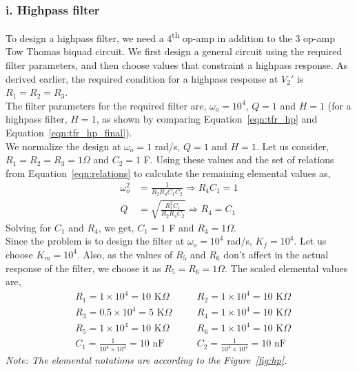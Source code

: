 \documentclass{lab_sheet}
\begin{document}
\subsubsection*{i. Highpass filter}
To design a highpass filter, we need a 4\textsuperscript{th} op-amp in addition to the 3 op-amp Tow Thomas biquad circuit. We first design a general circuit using the required filter parameters, and then choose values that constraint a highpass response. As derived earlier, the required condition for a highpass response at $V_2'$ is $R_1=R_2=R_3$.\\
The filter parameters for the required filter are, $\omega_o=10^4$, $Q=1$ and $H=1$ (for a highpass filter, $H=1$, as shown by comparing Equation~\ref{eqn:tfr_hp} and Equation~\ref{eqn:tfr_hp_final}).\\
We normalize the design at $\omega_o=1$ rad/s, $Q=1$ and $H=1$. Let us consider, $R_1=R_2=R_3=1\Omega$ and $C_2=1$ F. Using these values and the set of relations from Equation~\ref{eqn:relations} to calculate the remaining elemental values as,
 \begin{equation*}
    \begin{aligned}
       \omega_o^2&=\frac{1}{R_2R_4C_1C_2}\Rightarrow R_4C_1=1\\
       Q&=\sqrt{\frac{R_1^2C_1}{R_2R_4C_2}}\Rightarrow R_4=C_1
    \end{aligned}
\end{equation*}
Solving for $C_1$ and $R_4$, we get, $C_1=1$ F and  $R_4=1\Omega$.\\
Since the problem is to design the filter at $\omega_o=10^4$ rad/s, $K_f=10^4$. Let us choose $K_m=10^4$. Also, as the values of $R_5$ and $R_6$ don't affect in the actual response of the filter, we choose it as $R_5=R_6=1\Omega$. The scaled elemental values are,
 \begin{equation*}
    \begin{aligned}
       &R_1=1\times10^4=10 \text{ K}\Omega \quad &&R_2=1\times10^4=10 \text{ K}\Omega\\
       &R_3=0.5\times10^4=5 \text{ K}\Omega \quad &&R_4=1\times10^4=10 \text{ K}\Omega\\
       &R_5=1\times10^4=10 \text{ K}\Omega \quad &&R_6=1\times10^4=10 \text{ K}\Omega\\
       &C_1= \frac{1}{10^4\times10^4}=10\text{ nF} \quad && 
       C_2= \frac{1}{10^4\times10^4}=10\text{ nF}
    \end{aligned}
\end{equation*}
\textit{Note: The elemental notations are according to the Figure~\ref{fig:hp}.}
\end{document}
